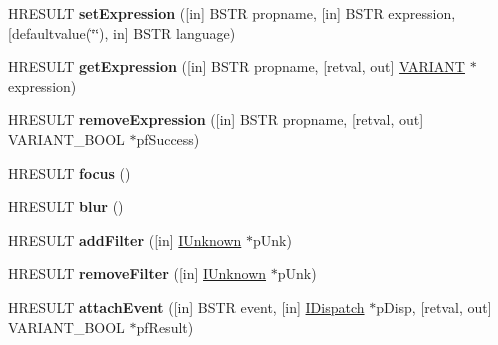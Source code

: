 \begin{DoxyCompactItemize}
H\+R\+E\+S\+U\+LT {\bfseries set\+Expression} (\mbox{[}in\mbox{]} B\+S\+TR propname, \mbox{[}in\mbox{]} B\+S\+TR expression, \mbox{[}defaultvalue(\char`\"{}\char`\"{}), in\mbox{]} B\+S\+TR language)
\item 
\mbox{\label{interface_m_s_h_t_m_l_1_1_i_h_t_m_l_element2_a7c83912238d60026d5cf2ccde3bead02}} 
H\+R\+E\+S\+U\+LT {\bfseries get\+Expression} (\mbox{[}in\mbox{]} B\+S\+TR propname, \mbox{[}retval, out\mbox{]} \hyperlink{structtag_v_a_r_i_a_n_t}{V\+A\+R\+I\+A\+NT} $\ast$expression)
\item 
\mbox{\label{interface_m_s_h_t_m_l_1_1_i_h_t_m_l_element2_adcc7e56aed74098eda1e211c651fe594}} 
H\+R\+E\+S\+U\+LT {\bfseries remove\+Expression} (\mbox{[}in\mbox{]} B\+S\+TR propname, \mbox{[}retval, out\mbox{]} V\+A\+R\+I\+A\+N\+T\+\_\+\+B\+O\+OL $\ast$pf\+Success)
\item 
\mbox{\label{interface_m_s_h_t_m_l_1_1_i_h_t_m_l_element2_a09f00f999da651ed6e84ec4cdf0cad55}} 
H\+R\+E\+S\+U\+LT {\bfseries focus} ()
\item 
\mbox{\label{interface_m_s_h_t_m_l_1_1_i_h_t_m_l_element2_a4c331d363f2d920be9e67ce21a29858d}} 
H\+R\+E\+S\+U\+LT {\bfseries blur} ()
\item 
\mbox{\label{interface_m_s_h_t_m_l_1_1_i_h_t_m_l_element2_a8336b10055afe85e39b3978a8042bcbe}} 
H\+R\+E\+S\+U\+LT {\bfseries add\+Filter} (\mbox{[}in\mbox{]} \hyperlink{interface_i_unknown}{I\+Unknown} $\ast$p\+Unk)
\item 
\mbox{\label{interface_m_s_h_t_m_l_1_1_i_h_t_m_l_element2_a203fe0d8a729b8d30ac4876d7c34305b}} 
H\+R\+E\+S\+U\+LT {\bfseries remove\+Filter} (\mbox{[}in\mbox{]} \hyperlink{interface_i_unknown}{I\+Unknown} $\ast$p\+Unk)
\item 
\mbox{\label{interface_m_s_h_t_m_l_1_1_i_h_t_m_l_element2_ad3c41cf4fe849abfcddbb5f6e278bdb6}} 
H\+R\+E\+S\+U\+LT {\bfseries attach\+Event} (\mbox{[}in\mbox{]} B\+S\+TR event, \mbox{[}in\mbox{]} \hyperlink{interface_i_dispatch}{I\+Dispatch} $\ast$p\+Disp, \mbox{[}retval, out\mbox{]} V\+A\+R\+I\+A\+N\+T\+\_\+\+B\+O\+OL $\ast$pf\+Result)

\end{DoxyCompactItemize}

